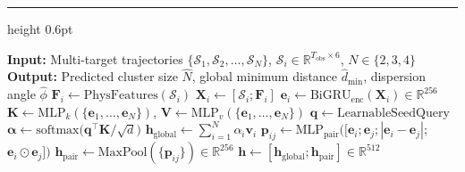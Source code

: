 \documentclass[a4paper,fleqn]{cas-dc}
\begin{document}
\noindent
\begin{minipage}{\columnwidth}
    \hrule height 0.6pt
    \vspace{3pt}
    \small
    \begin{algorithmic}[1]
        \State \textbf{Input:} Multi-target trajectories $\{\mathcal{S}_1, \mathcal{S}_2, \dots, \mathcal{S}_N\}$, $\mathcal{S}_i \in \mathbb{R}^{T_{\text{obs}} \times 6}$, $N \in \{2,3,4\}$
        \State \textbf{Output:} Predicted cluster size $\hat{N}$, global minimum distance $\hat{d}_{\min}$, dispersion angle $\hat{\phi}$
        \State {}
        \State $\bm{F}_i \gets \text{PhysFeatures}(\mathcal{S}_i)$\label{alg:phys_feat}
        \Statex \hspace*{2em} 
        \State $\bm{X}_i \gets [\mathcal{S}_i; \bm{F}_i]$\label{alg:aug_state}
        \Statex \hspace*{2em} 
        \EndFor
        \State {}
        \State $\bm{e}_i \gets \text{BiGRU}_{\text{enc}}(\bm{X}_i) \in \mathbb{R}^{256}$\label{alg:bigru_encode}
        \EndFor
        \State {}
        \State $\bm{K} \gets \text{MLP}_k(\{\bm{e}_1, \dots, \bm{e}_N\})$,
        \Statex \hspace*{2em} $\bm{V} \gets \text{MLP}_v(\{\bm{e}_1, \dots, \bm{e}_N\})$\label{alg:set_attn}
        \State $\bm{q} \gets \text{LearnableSeedQuery}$ 
        \State $\bm{\alpha} \gets \text{softmax}\big(\bm{q}^\top \bm{K} / \sqrt{d}\big)$ 
        \State $\bm{h}_{\text{global}} \gets \sum_{i=1}^{N} \alpha_i \bm{v}_i$\label{alg:global_repr}
        \State {}
        \State $\bm{p}_{ij} \gets \text{MLP}_{\text{pair}}([\bm{e}_i; \bm{e}_j; |\bm{e}_i-\bm{e}_j|;$
                        \Statex \hspace*{2em} $\bm{e}_i \odot \bm{e}_j])$\label{alg:pairwise}
        \EndFor
        \State $\bm{h}_{\text{pair}} \gets \text{MaxPool}(\{\bm{p}_{ij}\}) \in \mathbb{R}^{256}$\label{alg:pair_pool}
        \State $\bm{h} \gets [\bm{h}_{\text{global}}; \bm{h}_{\text{pair}}] \in \mathbb{R}^{512}$\label{alg:concat}

\end{algorithmic}
\end{minipage}
\end{document}
